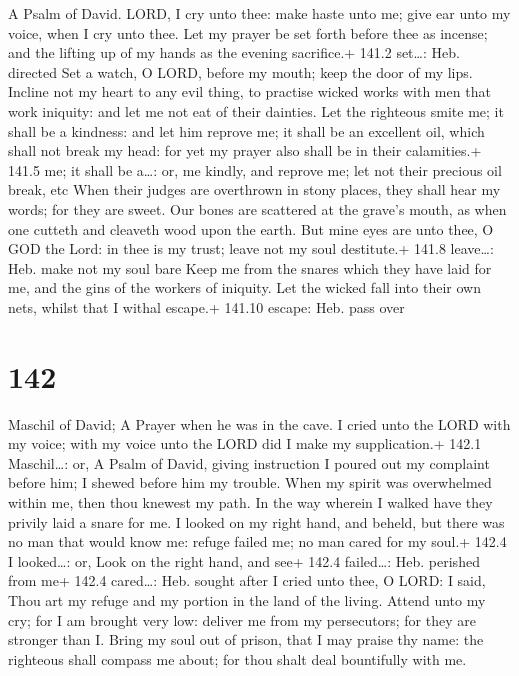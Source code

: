 A Psalm of David.  LORD, I cry unto thee: make haste unto
me; give ear unto my voice, when I cry unto thee.  Let my
prayer be set forth before thee as incense; and the lifting up of my
hands as the evening sacrifice.+ 141.2 set\ldots: Heb. directed
 Set a watch, O LORD, before my mouth; keep the door of my
lips.  Incline not my heart to any evil thing, to practise
wicked works with men that work iniquity: and let me not eat of their
dainties.  Let the righteous smite me; it shall be a
kindness: and let him reprove me; it shall be an excellent oil, which
shall not break my head: for yet my prayer also shall be in their
calamities.+ 141.5 me; it shall be a\ldots: or, me kindly, and reprove
me; let not their precious oil break, etc  When their judges
are overthrown in stony places, they shall hear my words; for they are
sweet.  Our bones are scattered at the grave's mouth, as
when one cutteth and cleaveth wood upon the earth.  But mine
eyes are unto thee, O GOD the Lord: in thee is my trust; leave not my
soul destitute.+ 141.8 leave\ldots: Heb. make not my soul bare
 Keep me from the snares which they have laid for me, and
the gins of the workers of iniquity.  Let the wicked fall
into their own nets, whilst that I withal escape.+ 141.10 escape: Heb.
pass over

\hypertarget{section-142}{%
\section{142}\label{section-142}}

Maschil of David; A Prayer when he was in the cave.  I cried
unto the LORD with my voice; with my voice unto the LORD did I make my
supplication.+ 142.1 Maschil\ldots: or, A Psalm of David, giving
instruction  I poured out my complaint before him; I shewed
before him my trouble.  When my spirit was overwhelmed
within me, then thou knewest my path. In the way wherein I walked have
they privily laid a snare for me.  I looked on my right
hand, and beheld, but there was no man that would know me: refuge failed
me; no man cared for my soul.+ 142.4 I looked\ldots: or, Look on the
right hand, and see+ 142.4 failed\ldots: Heb. perished from me+ 142.4
cared\ldots: Heb. sought after  I cried unto thee, O LORD: I
said, Thou art my refuge and my portion in the land of the living.
 Attend unto my cry; for I am brought very low: deliver me
from my persecutors; for they are stronger than I.  Bring my
soul out of prison, that I may praise thy name: the righteous shall
compass me about; for thou shalt deal bountifully with me.

